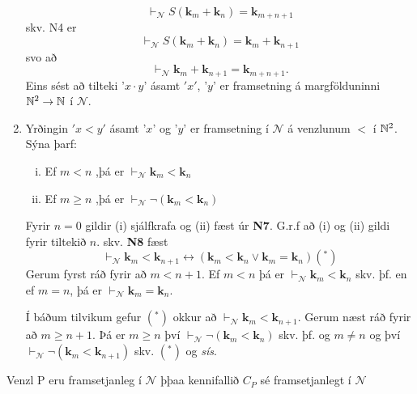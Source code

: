 \documentclass[12pt]{book}
\newcommand{\cN}{\mathcal{N}}
\newcommand{\bk}{\mathbf{k}}
\begin{document}
\begin{daemi}
\begin{enumerate}[(1)]
    \[ \vdash_{\cN} S(\bk_m + \bk_n) = \bk_{m+n+1}\]
    skv. N4 er
    \[ \vdash_{\cN} S(\bk_m + \bk_n) = \bk_{m} + \bk_{n+1}\]
    svo að
    \[ \vdash_{\cN} \bk_m + \bk_{n+1} = \bk_{m+n+1}.\]
    Eins sést að tilteki '$x\cdot y$' ásamt $'x'$, '$y$' er
    framsetning  á margfölduninni $\mathbb{N}^2 \to \mathbb{N}$ í $\cN$.
  \item  Yrðingin $'x < y'$ ásamt '$x$' og '$y$' er
    framsetning í $\cN$ á venzlunum $<$ í $\mathbb{N}^2$. Sýna þarf:
    \begin{enumerate}[(i)]
    \item  Ef $m < n$ ,þá er $\vdash_{\cN} \bk_m < \bk_n$
    \item  Ef $m \geq n$ ,þá er $\vdash_{\cN} \lnot (\bk_m < \bk_n)$ 
    \end{enumerate}
    Fyrir $n = 0$ gildir (i) sjálfkrafa og (ii) fæst úr \textbf{N7}.
    G.r.f að (i) og (ii) gildi fyrir tiltekið $n$. skv. \textbf{N8}
    fæst
    \[ \vdash_{\cN} \bk_m < \bk_{n+1} \leftrightarrow (\bk_m < \bk_n \vee \bk_m = \bk_n) (^*) \]
    Gerum fyrst ráð fyrir að $m < n+1$. Ef $m<n$ þá er $\vdash_{\cN} \bk_m < \bk_n$
    skv. þf. en ef $ m = n$, þá er $\vdash_{\cN} \bk_m = \bk_n$.

    Í báðum tilvikum gefur $(^*)$ okkur að $\vdash_{\cN} \bk_m < \bk_{n+1}$.
    Gerum næst ráð fyrir að $m \geq n+1$. Þá er $m \geq n$
    því $\vdash_{\cN} \lnot (\bk_m < \bk_n)$ skv. þf. og 
    $m \neq n$ og því $\vdash_{\cN} \lnot (\bk_m < \bk_{n+1})$
    skv. $(^*)$ og \emph{sís}.
  \end{enumerate}
\end{daemi}

\begin{setn}
  Venzl P eru framsetjanleg í $\cN$ þþaa kennifallið $C_P$ sé framsetjanlegt í $\cN$
\end{setn}
\end{document}
